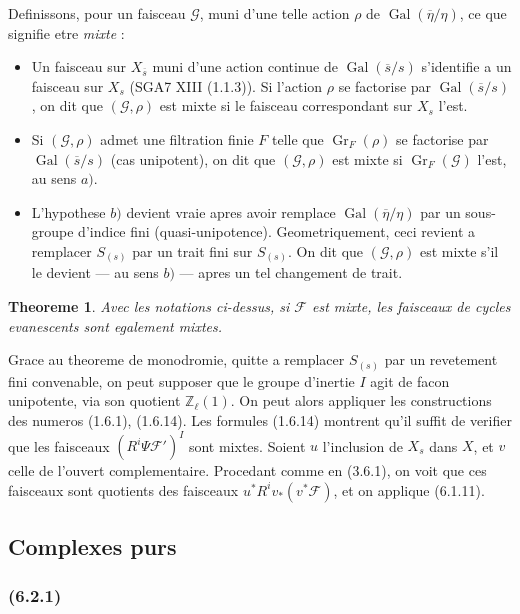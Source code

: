 \documentclass[12pt,a4paper]{article}
\theoremstyle{plain}
\newtheorem{theorem}{Theoreme}[section]
\theoremstyle{definition}
\theoremstyle{remark}
\DeclareMathOperator{\Gal}{Gal}
\DeclareMathOperator{\Gr}{Gr}
\newcommand{\scrF}{\mathscr{F}}
\newcommand{\scrG}{\mathscr{G}}
\newcommand{\Zl}{\mathbb{Z}_\ell}
\begin{document}
Definissons, pour un faisceau $\scrG$, muni d'une telle action $\rho$ de $\Gal(\overline{\eta}/\eta)$, ce que signifie etre \emph{mixte} :
\begin{itemize}
\item[$a)$] Un faisceau sur $X_{\overline{s}}$ muni d'une action continue de $\Gal(\overline{s}/s)$ s'identifie a un faisceau sur $X_s$ (SGA7 XIII (1.1.3)). Si l'action $\rho$ se factorise par $\Gal(\overline{s}/s)$, on dit que $(\scrG, \rho)$ est mixte si le faisceau correspondant sur $X_s$ l'est.
\item[$b)$] Si $(\scrG, \rho)$ admet une filtration finie $F$ telle que $\Gr_F(\rho)$ se factorise par $\Gal(\overline{s}/s)$ (cas unipotent), on dit que $(\scrG, \rho)$ est mixte si $\Gr_F(\scrG)$ l'est, au sens $a)$.
\item[$c)$] L'hypothese $b)$ devient vraie apres avoir remplace $\Gal(\overline{\eta}/\eta)$ par un sous-groupe d'indice fini (quasi-unipotence). Geometriquement, ceci revient a remplacer $S_{(s)}$ par un trait fini sur $S_{(s)}$. On dit que $(\scrG, \rho)$ est mixte s'il le devient --- au sens $b)$ --- apres un tel changement de trait.
\end{itemize}

\begin{theorem}
Avec les notations ci-dessus, si $\scrF$ est mixte, les faisceaux de cycles evanescents sont egalement mixtes.
\end{theorem}

Grace au theoreme de monodromie, quitte a remplacer $S_{(s)}$ par un revetement fini convenable, on peut supposer que le groupe d'inertie $I$ agit de facon unipotente, via son quotient $\Zl(1)$. On peut alors appliquer les constructions des numeros (1.6.1), (1.6.14). Les formules (1.6.14) montrent qu'il suffit de verifier que les faisceaux $(R^i \Psi \scrF')^I$ sont mixtes. Soient $u$ l'inclusion de $X_s$ dans $X$, et $v$ celle de l'ouvert complementaire. Procedant comme en (3.6.1), on voit que ces faisceaux sont quotients des faisceaux $u^* R^i v_*(v^* \scrF)$, et on applique (6.1.11).

\subsection{Complexes purs}

\subsubsection*{\textup{(6.2.1)}}
\end{document}
